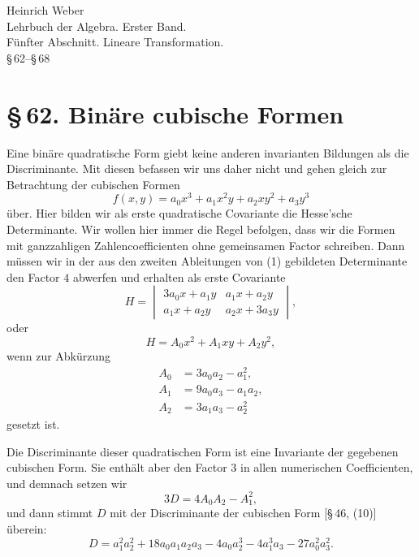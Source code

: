\documentclass[11pt]{article}
\newcommand{\sect}[2]{\section*{\S\,#1. #2}}
\begin{document}
\begin{center}
{\large Heinrich Weber}\\[0.35em]
{\Large Lehrbuch der Algebra. Erster Band.}\\[0.35em]
{\large Fünfter Abschnitt. Lineare Transformation.}\\[0.25em]
{\large \S\,62--\S\,68}
\end{center}

\sect{62}{Binäre cubische Formen}

Eine binäre quadratische Form giebt keine anderen invarianten Bildungen als die Discriminante. Mit diesen befassen wir uns daher nicht und gehen gleich zur Betrachtung der cubischen Formen
\begin{equation}
 f(x,y)=a_0x^3+a_1x^2y+a_2xy^2+a_3y^3
\tag{1}
\end{equation}
über. Hier bilden wir als erste quadratische Covariante die Hesse'sche Determinante. Wir wollen hier immer die Regel befolgen, dass wir die Formen mit ganzzahligen Zahlencoefficienten ohne gemeinsamen Factor schreiben. Dann müssen wir in der aus den zweiten Ableitungen von (1) gebildeten Determinante den Factor $4$ abwerfen und erhalten als erste Covariante
\[
 H=\begin{vmatrix}
 3a_0x+a_1y & a_1x+a_2y\\
 a_1x+a_2y & a_2x+3a_3y
 \end{vmatrix},
\]
oder
\begin{equation}
 H=A_0x^2+A_1xy+A_2y^2,
\tag{2}
\end{equation}
wenn zur Abkürzung
\begin{equation}
\begin{aligned}
 A_0&=3a_0a_2-a_1^2,\\
 A_1&=9a_0a_3-a_1a_2,\\
 A_2&=3a_1a_3-a_2^2
\end{aligned}
\tag{3}
\end{equation}
gesetzt ist.

Die Discriminante dieser quadratischen Form ist eine Invariante der gegebenen cubischen Form. Sie enthält aber den Factor $3$ in allen numerischen Coefficienten, und demnach setzen wir
\begin{equation}
 3D=4A_0A_2-A_1^2,
\tag{4}
\end{equation}
und dann stimmt $D$ mit der Discriminante der cubischen Form [\S\,46, (10)] überein:
\begin{equation}
 D=a_1^2a_2^2+18a_0a_1a_2a_3-4a_0a_2^3-4a_1^3a_3-27a_0^2a_3^2.
\tag{5}
\end{equation}
\end{document}
